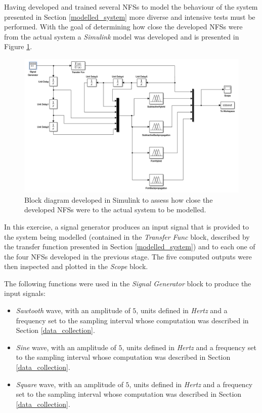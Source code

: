 \documentclass[11pt]{article}
\begin{document}
Having developed and trained several NFSs to model the behaviour of the system presented in Section \ref{modelled_system} more diverse and intensive tests must be performed. With the goal of determining how close the developed NFSs were from the actual system a \emph{Simulink} model was developed and is presented in Figure \ref{assessment_simulink}.

\begin{figure}[ht]
	\centering
	\includegraphics[scale=0.4]{images/assessment_simulink.png}
	\caption{Block diagram developed in Simulink to assess how close the developed NFSs were to the actual system to be modelled.}
	\label{assessment_simulink}
\end{figure}

In this exercise, a signal generator produces an input signal that is provided to the system being modelled (contained in the \emph{Transfer Func} block, described by the transfer function presented in Section \ref{modelled_system}) and to each one of the four NFSs developed in the previous stage. The five computed outputs were then inspected and plotted in the \emph{Scope} block.

The following functions were used in the \emph{Signal Generator} block to produce the input signals:

\begin{itemize}
	\item \emph{Sawtooth} wave, with an amplitude of $5$, units defined in \emph{Hertz} and a frequency set to the sampling interval whose computation was described in Section \ref{data_collection}.
		
	\item \emph{Sine} wave, with an amplitude of $5$, units defined in \emph{Hertz} and a frequency set to the sampling interval whose computation was described in Section \ref{data_collection}.
	
	\item \emph{Square} wave, with an amplitude of $5$, units defined in \emph{Hertz} and a frequency set to the sampling interval whose computation was described in Section \ref{data_collection}. 
\end{itemize}
\end{document}
